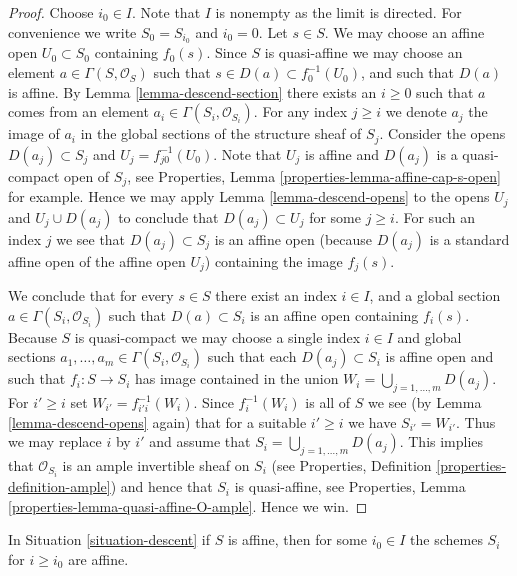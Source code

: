 \begin{proof}
Choose $i_0 \in I$. Note that $I$ is nonempty as the limit is directed.
For convenience we write $S_0 = S_{i_0}$ and $i_0 = 0$.
Let $s \in S$. We may choose an affine open
$U_0 \subset S_0$ containing $f_0(s)$. Since $S$ is quasi-affine
we may choose an element $a \in \Gamma(S, \mathcal{O}_S)$ such
that $s \in D(a) \subset f_0^{-1}(U_0)$, and such that
$D(a)$ is affine. By Lemma \ref{lemma-descend-section}
there exists an $i \geq 0$ such that $a$
comes from an element $a_i \in \Gamma(S_i, \mathcal{O}_{S_i})$.
For any index $j \geq i$ we denote $a_j$
the image of $a_i$ in the global sections of the
structure sheaf of $S_j$.
Consider the opens $D(a_j) \subset S_j$
and $U_j = f_{j0}^{-1}(U_0)$. Note that
$U_j$ is affine and $D(a_j)$ is a quasi-compact open of $S_j$,
see Properties, Lemma \ref{properties-lemma-affine-cap-s-open}
for example. Hence we may apply Lemma \ref{lemma-descend-opens} to the opens
$U_j$ and $U_j \cup D(a_j)$ to conclude that
$D(a_j) \subset U_j$ for some  $j \geq i$.
For such an index $j$ we see that $D(a_j) \subset S_j$ is an affine open
(because $D(a_j)$ is a standard affine open of the affine open $U_j$)
containing the image $f_j(s)$.

\medskip\noindent
We conclude that for every $s \in S$ there exist
an index $i \in I$, and a global section
$a \in \Gamma(S_i, \mathcal{O}_{S_i})$
such that $D(a) \subset S_i$ is an affine open
containing $f_i(s)$. Because $S$ is quasi-compact we
may choose a single index $i \in I$ and global sections
$a_1, \ldots, a_m \in \Gamma(S_i, \mathcal{O}_{S_i})$
such that each $D(a_j) \subset S_i$ is affine open
and such that $f_i : S \to S_i$ has image contained
in the union $W_i = \bigcup_{j = 1, \ldots, m} D(a_j)$.
For $i' \geq i$ set $W_{i'} = f_{i'i}^{-1}(W_i)$.
Since $f_i^{-1}(W_i)$ is all of $S$ we see
(by Lemma \ref{lemma-descend-opens} again)
that for a suitable $i' \geq i$ we
have $S_{i'} = W_{i'}$. Thus we may replace $i$ by
$i'$ and assume that $S_i = \bigcup_{j = 1, \ldots, m} D(a_j)$.
This implies that $\mathcal{O}_{S_i}$ is an ample invertible
sheaf on $S_i$ (see Properties, Definition \ref{properties-definition-ample})
and hence that $S_i$ is quasi-affine, see
Properties, Lemma \ref{properties-lemma-quasi-affine-O-ample}.
Hence we win.
\end{proof}

\begin{lemma}
\label{lemma-limit-affine}
In Situation \ref{situation-descent} if $S$ is affine,
then for some $i_0 \in I$ the schemes $S_i$ for $i \geq i_0$
are affine.
\end{lemma}

